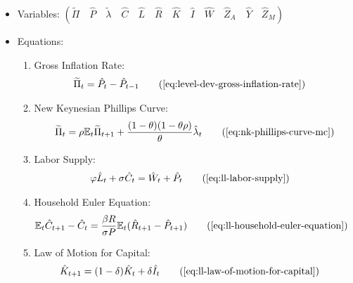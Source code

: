 \documentclass[
	12pt,
	]{article}
\numberwithin{equation}{section}
\DeclareMathOperator{\dif}{d}
\newcommand{\E}[1][t]{{\mathbb{E}_{#1}}}
\theoremstyle{definition}
\theoremstyle{plain}
\theoremstyle{plain}
\theoremstyle{plain}
\begin{document}
{\singlespacing
	
	\begin{itemize}
		
		\item Variables: \( \left( \tilde{\Pi} \quad \hat{P} \quad \tilde{\lambda} \quad \hat{C} \quad \hat{L} \quad \hat{R} \quad \hat{K} \quad \hat{I} \quad \hat{W} \quad \hat{Z}_A \quad \hat{Y} \quad \hat{Z}_M \right) \)
		
		\item Equations:
		
		\begin{enumerate}
			
			\item Gross Inflation Rate:
			\begin{align}
				\widetilde{\Pi}_t &= \hat{P}_t - \hat{P}_{t-1}
				\tag{\ref{eq:level-dev-gross-inflation-rate}}
			\end{align}
			
			\item New Keynesian Phillips Curve:
			\begin{align}
				\widetilde{\Pi}_t = \rho \E \widetilde{\Pi}_{t+1} + \frac{(1-\theta) (1- \theta \rho)}{\theta} \hat{\lambda}_t
				\tag{\ref{eq:nk-phillips-curve-mc}}
			\end{align}
			
			\item Labor Supply:
			\begin{align}
				\varphi \hat{L}_t + \sigma \hat{C}_t &= \hat{W}_t + \hat{P}_t
				\tag{\ref{eq:ll-labor-supply}}
			\end{align}
			
			\item Household Euler Equation:
			\begin{align}
				\E \hat{C}_{t+1} - \hat{C}_t &= \frac{\beta R}{\sigma P} \E(\hat{R}_{t+1} - \hat{P}_{t+1})
				\tag{\ref{eq:ll-household-euler-equation}}
			\end{align}
			
			\item Law of Motion for Capital:
			\begin{align}
				\hat{K}_{t+1} &= (1-\delta)\hat{K}_t + \delta \hat{I}_t
				\tag{\ref{eq:ll-law-of-motion-for-capital}}
			\end{align}
			
			

\end{enumerate}
\end{itemize}}
\end{document}

